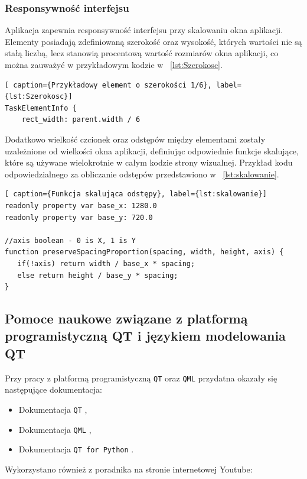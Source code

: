 \subsubsection{Responsywność interfejsu}
\label{sec:ResponsywnośćInterfejsu}
Aplikacja zapewnia responsywność interfejsu przy skalowaniu okna aplikacji. Elementy posiadają zdefiniowaną szerokość oraz wysokość, których wartości nie są stałą liczbą, lecz stanowią procentową wartość rozmiarów okna aplikacji, co można zauważyć w przykładowym kodzie w \lstlistingname{~\ref{lst:Szerokosc}}.
\begin{lstlisting}[ caption={Przykładowy element o szerokości 1/6}, label={lst:Szerokosc}]
TaskElementInfo {
    rect_width: parent.width / 6
\end{lstlisting}
Dodatkowo wielkość czcionek oraz odstępów między elementami zostały uzależnione od wielkości okna aplikacji, definiując odpowiednie funkcje skalujące, które są używane wielokrotnie w całym kodzie strony wizualnej. Przykład kodu odpowiedzialnego za obliczanie odstępów przedstawiono w \lstlistingname{~\ref{lst:skalowanie}}.
\begin{lstlisting}[ caption={Funkcja skalująca odstępy}, label={lst:skalowanie}]
readonly property var base_x: 1280.0
readonly property var base_y: 720.0
    
//axis boolean - 0 is X, 1 is Y
function preserveSpacingProportion(spacing, width, height, axis) {
   if(!axis) return width / base_x * spacing;
   else return height / base_y * spacing;
}
\end{lstlisting}

\subsection{Pomoce naukowe związane z platformą programistyczną QT i językiem modelowania QT}
\label{sec:PomoceNaukoweQML}
Przy pracy z platformą programistyczną \texttt{QT} oraz \texttt{QML} przydatna okazały się następujące dokumentacja: 
\begin{itemize}
    \item Dokumentacja \texttt{QT} \cite{DokumentacjaQT},
    \item Dokumentacja \texttt{QML} \cite{DokumentacjaQML},
    \item Dokumentacja \texttt{QT for Python} \cite{DokumentacjaQtForPython}.
\end{itemize}
Wykorzystano również z poradnika na stronie internetowej Youtube: \cite{PoradnikQMLYoutube}